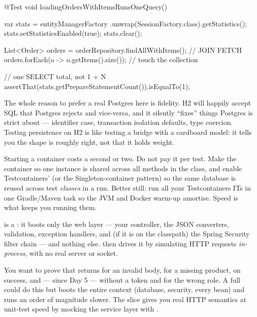 \begin{javabox}
@Test
void loadingOrdersWithItemsRunsOneQuery() {
  var stats = entityManagerFactory
      .unwrap(SessionFactory.class).getStatistics();
  stats.setStatisticsEnabled(true);
  stats.clear();

  List<Order> orders = orderRepository.findAllWithItems(); // JOIN FETCH
  orders.forEach(o -> o.getItems().size());  // touch the collection

  // one SELECT total, not 1 + N
  assertThat(stats.getPrepareStatementCount()).isEqualTo(1);
}
\end{javabox}

\begin{dbinsight}
The whole reason to prefer a real Postgres here is fidelity. H2 will happily accept SQL that Postgres rejects and vice-versa, and it silently ``fixes'' things Postgres is strict about --- identifier case, transaction isolation defaults, type coercion. Testing persistence on H2 is like testing a bridge with a cardboard model: it tells you the shape is roughly right, not that it holds weight.
\end{dbinsight}

\begin{perfnote}
Starting a container costs a second or two. Do not pay it per test. Make the container  so one instance is shared across all methods in the class, and enable Testcontainers'  (or the Singleton-container pattern) so the same database is reused across test \emph{classes} in a run. Better still: run all your Testcontainers ITs in one Gradle/Maven task so the JVM and Docker warm-up amortise. Speed is what keeps you running them.
\end{perfnote}


  is a : it boots only the web layer --- your controller, the JSON converters, validation, exception handlers, and (if it is on the classpath) the Spring Security filter chain --- and nothing else.  then drives it by simulating HTTP requests \emph{in-process}, with no real server or socket.

 You want to prove that  returns  for an invalid body,  for a missing product,  on success, and --- since Day 5 ---  without a token and  for the wrong role. A full  could do this but boots the entire context (database, security, every bean) and runs an order of magnitude slower. The slice gives you real HTTP semantics at unit-test speed by mocking the service layer with .

